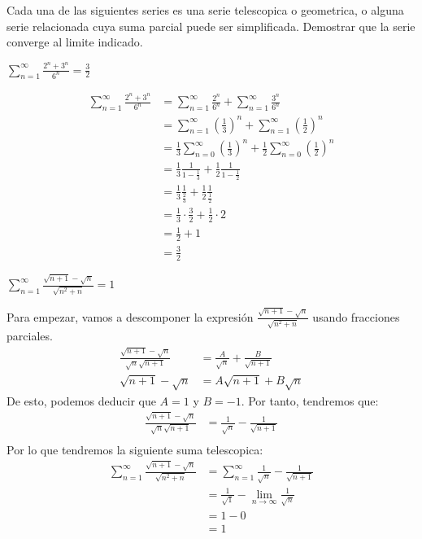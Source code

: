 \documentclass[../main.tex]{subfiles}
\begin{document}
Cada una de las siguientes series es una serie telescopica o geometrica, o alguna serie relacionada cuya suma parcial puede ser simplificada. Demostrar que la serie converge al limite indicado.

\question $\sum\limits_{n = 1}^\infty \frac{2^n+3^n}{6^n} = \frac{3}{2}$

\begin{align*}
    \sum_{n = 1}^\infty \frac{2^n+3^n}{6^n} &= \sum_{n = 1}^\infty \frac{2^n}{6^n} + \sum_{n = 1}^\infty \frac{3^n}{6^n}\\
    &= \sum_{n = 1}^\infty \left(\frac{1}{3}\right)^n + \sum_{n = 1}^\infty \left(\frac{1}{2}\right)^n\\
    &=\frac{1}{3} \sum_{n = 0}^\infty \left(\frac{1}{3}\right)^n + \frac{1}{2}\sum_{n = 0}^\infty \left(\frac{1}{2}\right)^n\\
    &=\frac{1}{3} \frac{1}{1-\frac{1}{3}} + \frac{1}{2}\frac{1}{1-\frac{1}{2}}\\
    &= \frac{1}{3} \frac{1}{\frac{2}{3}} + \frac{1}{2} \frac{1}{\frac{1}{2}}\\
    &= \frac{1}{3} \cdot \frac{3}{2} + \frac{1}{2} \cdot 2\\
    &= \frac{1}{2} + 1\\
    &= \frac{3}{2}
\end{align*}


\question $\sum\limits_{n = 1}^\infty \frac{\sqrt{n+1} - \sqrt{n}}{\sqrt{n^2+n}} = 1$

Para empezar, vamos a descomponer la expresión $\frac{\sqrt{n+1} - \sqrt{n}}{\sqrt{n^2+n}}$ usando fracciones parciales.
\begin{align*}
    \frac{\sqrt{n+1} - \sqrt{n}}{\sqrt{n} \sqrt{n+1}} &= \frac{A}{\sqrt{n}} + \frac{B}{\sqrt{n+1}}\\
    \sqrt{n+1} - \sqrt{n} &= A\sqrt{n+1} + B\sqrt{n} 
\end{align*}
De esto, podemos deducir que $A = 1$ y $B = -1$. Por tanto, tendremos que:
\begin{align*}
    \frac{\sqrt{n+1} - \sqrt{n}}{\sqrt{n} \sqrt{n+1}} &= \frac{1}{\sqrt{n}} - \frac{1}{\sqrt{n+1}}\\
\end{align*}
Por lo que tendremos la siguiente suma telescopica:
\begin{align*}
    \sum\limits_{n = 1}^\infty \frac{\sqrt{n+1} - \sqrt{n}}{\sqrt{n^2+n}} &= \sum\limits_{n = 1}^\infty \frac{1}{\sqrt{n}} - \frac{1}{\sqrt{n+1}}\\
    &= \frac{1}{\sqrt{1}} - \lim_{n \to \infty} \frac{1}{\sqrt{n}}\\
    &= 1 - 0\\
    &= 1
\end{align*}
\end{document}
